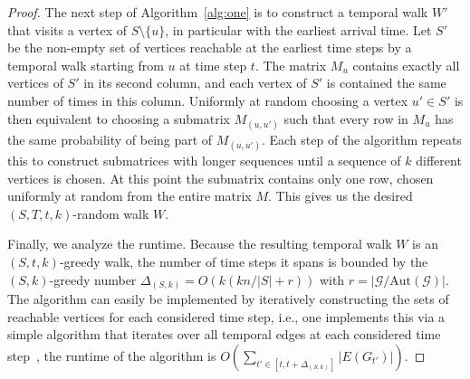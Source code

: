 \documentclass[10pt,a4paper]{article}
\newcommand{\auttg}{\ensuremath{\text{Aut}(\mathcal{G})}}
\newcommand{\torb}{\ensuremath{\mathcal{G}/\auttg}}
\begin{document}
{\begin{proof}
    The next step of Algorithm~\ref{alg:one} is to construct a
    temporal walk $W'$ that visits a vertex of $S \setminus \{u\}$, in particular
    with the earliest arrival time. Let $S'$ be the non-empty set of vertices
    reachable at the earliest time steps by a temporal walk starting from $u$ at
    time step $t$. The matrix $M_u$ contains exactly all vertices of $S'$ in its
    second column, and each vertex of $S'$ is contained the same number of times in
    this column. Uniformly at random choosing a vertex $u' \in S'$ is then
    equivalent to choosing a submatrix $M_{(u, u')}$ such that every row in $M_u$
    has the same probability of being part of $M_{(u, u')}$.
    Each step of the algorithm repeats this to construct submatrices with longer
    sequences until a sequence of $k$ different vertices is chosen. At this
    point the submatrix contains only one row, chosen uniformly at random from
    the entire matrix $M$. This gives us the desired $(S, T, t, k)$-random walk
    $W$. 
    
    Finally, we analyze the runtime. Because the resulting temporal walk
    $W$ is an $(S, t, k)$-greedy walk, the number of time steps it spans is
    bounded by the $(S, k)$-greedy number $\Delta_{(S, k)} =O(k(k n/|S| + r))$ with
    $r=|\torb|$. The algorithm can easily be implemented by iteratively
    constructing the sets of reachable vertices for each considered time step,
    i.e., one implements this via a simple algorithm that iterates over all
    temporal edges at each considered time step~\cite{WuCYSYW16}, the runtime of
    the algorithm is $O(\sum_{{t'} \in [t, t+\Delta_{(S, k)}]} |E(G_{t'})|)$.
\end{proof}


}
\end{document}
